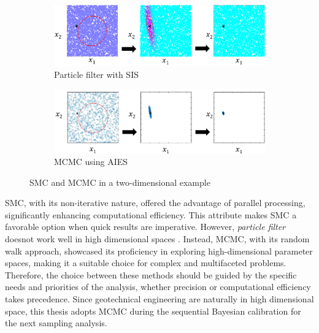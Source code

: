\begin{figure}
\centering
\begin{subfigure}[htbp]{1.0\textwidth}
   \includegraphics[width=140mm]{Figures/figure-PFvsMCMC-SIS.pdf}
   \caption{Particle filter with \acrlong{SIS}}
   \label{fig: PFvsMCMC_1} 
\end{subfigure}

\begin{subfigure}[htbp]{1.0\textwidth}
   \includegraphics[width=140mm]{Figures/figure-PFvsMCMCAIES.pdf}
   \caption{\acrlong{MCMC} using \acrlong{AIES}}
   \label{fig: PFvsMCMC_2}
\end{subfigure}

\caption[Two sampling method]{\acrshort{SMC} and \acrshort{MCMC} in a two-dimensional example}
\end{figure}

SMC, with its non-iterative nature, offered the advantage of parallel processing, significantly enhancing computational efficiency. This attribute makes \acrshort{SMC} a favorable option when quick results are imperative. However, \textit{particle filter} doesnot work well in high dimensional spaces \citep{murphy2012}. Instead, \acrshort{MCMC}, with its random walk approach, showcased its proficiency in exploring high-dimensional parameter spaces, making it a suitable choice for complex and multifaceted problems. Therefore, the choice between these methods should be guided by the specific needs and priorities of the analysis, whether precision or computational efficiency takes precedence. Since geotechnical engineering are naturally in high dimensional space, this thesis adopts \acrshort{MCMC} during the sequential Bayesian calibration for the next sampling analysis.


